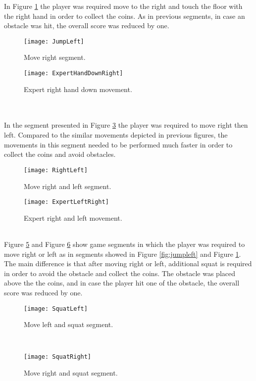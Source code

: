 In Figure \ref{fig:jumpright} the player was required move to the right and touch the floor with the right hand in order to collect the coins. As in previous segments, in case an obstacle was hit, the overall score was reduced by one.\\
\begin{figure}[h]
    \centering
    \texttt{[image: JumpLeft]}
    \caption{Move right segment.}
    \label{fig:jumpright}
\end{figure}
\begin{figure}[h]
    \centering
    \texttt{[image: ExpertHandDownRight]}
    \caption{Expert right hand down movement.}
    \label{fig:expertLeftDown}
\end{figure}\\\\
In the segment presented in Figure \ref{fig:rightleft} the player was required to move right then left. Compared to the similar movements depicted in previous figures, the movements in this segment needed to be performed much faster in order to collect the coins and avoid obstacles.\\
\begin{figure}[h]
    \centering
    \texttt{[image: RightLeft]}
    \caption{Move right and left segment.}
    \label{fig:rightleft}
\end{figure}
\begin{figure}[h]
    \centering
    \texttt{[image: ExpertLeftRight]}
    \caption{Expert right and left movement.}
    \label{fig:expertLeftRight}
\end{figure}\\
Figure \ref{fig:squatleft} and Figure \ref{fig:squatright} show game segments in which the player was required to move right or left as in segments showed in Figure \ref{fig:jumpleft} and Figure \ref{fig:jumpright}. The main difference is that after moving right or left, additional squat is required in order to avoid the obstacle and collect the coins. The obstacle was placed above the the coins, and in case the player hit one of the obstacle, the overall score was reduced by one.\\
\begin{figure}[h]
    \centering
    \texttt{[image: SquatLeft]}
    \caption{Move left and squat segment.}
    \label{fig:squatleft}
\end{figure}\\
\begin{figure}[h]
    \centering
    \texttt{[image: SquatRight]}
    \caption{Move right and squat segment.}
    \label{fig:squatright}
\end{figure}\\
